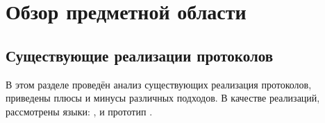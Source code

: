 \section{Обзор предметной области}





\subsection{Существующие реализации протоколов} \label{survey}
В этом разделе проведён анализ существующих реализация протоколов, приведены плюсы и минусы различных подходов. В качестве реализаций, рассмотрены языки: ,  и прототип .




